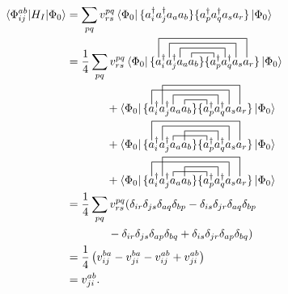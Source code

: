 \documentclass[10pt]{article}
\begin{document}
\begin{align}
\mel*{\Phi^{ab}_{ij}}{H_I}{\Phi_0}
&=
\sum_{pq}v^{pq}_{rs}\bra{\Phi_0}\{a^\dagger_ia^\dagger_ja_aa_b\}\{a^\dagger_{p}a^\dagger_{q}a_{s}a_{r}\}\ket{\Phi_0}
\\
&=
\frac{1}{4}\sum_{pq}v^{pq}_{rs}\bra{\Phi_0}
\contraction[1ex]
{\{a^\dagger_ia^\dagger_ja_a}{a}{_b\}\{}{a}
\contraction[2ex]
{\{a^\dagger_ia^\dagger_j}{a}{_aa_b\}\{a^\dagger_{p}}{a}
\contraction[3ex]
{\{a^\dagger_i}{a}{^\dagger_ja_aa_b\}\{a^\dagger_{p}a^\dagger_{q}}{a}
\contraction[4ex]
{\{}{a}{^\dagger_ia^\dagger_ja_aa_b\}\{a^\dagger_{p}a^\dagger_{q}a_{s}}{a}
\{a^\dagger_ia^\dagger_ja_aa_b\}\{a^\dagger_{p}a^\dagger_{q}a_{s}a_{r}\}
\ket{\Phi_0}
\nonumber
\\
&\hspace{12.5mm}+
\bra{\Phi_0}
\contraction[1ex]
{\{a^\dagger_ia^\dagger_ja_a}{a}{_b\}\{}{a}
\contraction[2ex]
{\{a^\dagger_ia^\dagger_j}{a}{_aa_b\}\{a^\dagger_{p}}{a}
\contraction[3ex]
{\{}{a}{^\dagger_ia^\dagger_ja_aa_b\}\{a^\dagger_{p}a^\dagger_{q}}{a}
\contraction[4ex]
{\{a^\dagger_i}{a}{^\dagger_ja_aa_b\}\{a^\dagger_{p}a^\dagger_{q}a_{s}}{a}
\{a^\dagger_ia^\dagger_ja_aa_b\}\{a^\dagger_{p}a^\dagger_{q}a_{s}a_{r}\}
\ket{\Phi_0}
\nonumber
\\
&\hspace{12.5mm}+
\bra{\Phi_0}
\contraction[1ex]
{\{a^\dagger_ia^\dagger_j}{a}{_aa_b\}\{}{a}
\contraction[2ex]
{\{a^\dagger_ia^\dagger_ja_a}{a}{_b\}\{a^\dagger_{p}}{a}
\contraction[3ex]
{\{a^\dagger_i}{a}{^\dagger_ja_aa_b\}\{a^\dagger_{p}a^\dagger_{q}}{a}
\contraction[4ex]
{\{}{a}{^\dagger_ia^\dagger_ja_aa_b\}\{a^\dagger_{p}a^\dagger_{q}a_{s}}{a}
\{a^\dagger_ia^\dagger_ja_aa_b\}\{a^\dagger_{p}a^\dagger_{q}a_{s}a_{r}\}
\ket{\Phi_0}
\nonumber
\\
&\hspace{12.5mm}+
\bra{\Phi_0}
\contraction[1ex]
{\{a^\dagger_ia^\dagger_j}{a}{_aa_b\}\{}{a}
\contraction[2ex]
{\{a^\dagger_ia^\dagger_ja_a}{a}{_b\}\{a^\dagger_{p}}{a}
\contraction[3ex]
{\{}{a}{^\dagger_ia^\dagger_ja_aa_b\}\{a^\dagger_{p}a^\dagger_{q}}{a}
\contraction[4ex]
{\{a^\dagger_i}{a}{^\dagger_ja_aa_b\}\{a^\dagger_{p}a^\dagger_{q}a_{s}}{a}
\{a^\dagger_ia^\dagger_ja_aa_b\}\{a^\dagger_{p}a^\dagger_{q}a_{s}a_{r}\}
\ket{\Phi_0}
\\
&=
\frac{1}{4}\sum_{pq}v^{pq}_{rs}
(
\delta_{ir}\delta_{js}\delta_{aq}\delta_{bp}
-
\delta_{is}\delta_{jr}\delta_{aq}\delta_{bp}
\nonumber
\\
&\hspace{13mm}-
\delta_{ir}\delta_{js}\delta_{ap}\delta_{bq}
+
\delta_{is}\delta_{jr}\delta_{ap}\delta_{bq}
)
\\
&=
\frac{1}{4}\left(v^{ba}_{ij}-v^{ba}_{ji}-v^{ab}_{ij}+v^{ab}_{ji}\right)
\\
&=
v^{ab}_{ji}.
\end{align}
\end{document}
